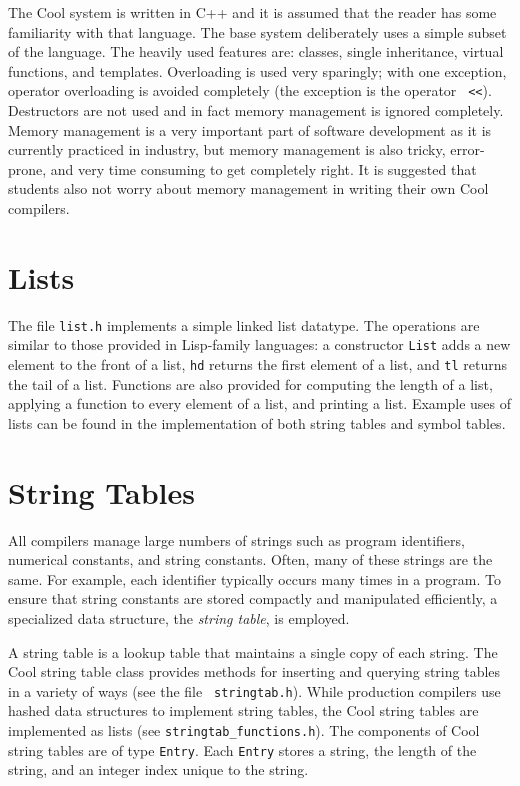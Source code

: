 \documentclass[11pt]{article}
\begin{document}
The Cool system is written in C++ and it is assumed that the reader
has some familiarity with that language.  The base system deliberately
uses a simple subset of the language.  The heavily used features are:
classes, single inheritance, virtual functions, and templates.
Overloading is used very sparingly; with one exception, operator
overloading is avoided completely (the exception is the operator {\tt
<<}).  Destructors are not used and in fact memory management is
ignored completely.  Memory management is a very important part of
software development as it is currently practiced in industry, but
memory management is also tricky, error-prone, and very time consuming
to get completely right.  It is suggested that students also not
worry about memory management in writing their own Cool compilers.

\section{Lists}

The file {\tt list.h} implements a simple linked list datatype.  The operations
are similar to those provided in Lisp-family languages: a constructor {\tt List}
adds a new element to the front of a list, {\tt hd} returns the first element
of a list, and {\tt tl} returns the tail of a list.  Functions are also
provided for computing the length of a list, applying a function to every
element of a list, and printing a list.
Example uses of lists can be found 
in the implementation of both string tables and symbol tables.

\section{String Tables}

All compilers manage large numbers of strings such as
program identifiers, numerical constants, and string constants.
Often, many of these strings are the same. For example,
each identifier typically occurs many times in a program.
To ensure that string constants are stored compactly and 
manipulated efficiently, a specialized data structure, the
{\em string table}, is employed.

A string table is a lookup table that maintains a single copy of each
string.  The Cool string table class provides methods for inserting
and querying string tables in a variety of ways (see the file {\tt
stringtab.h}).  While production compilers use hashed data structures
to implement string tables, the Cool string tables are implemented
as lists (see {\tt stringtab\_functions.h}).  The components
of Cool string tables are of type {\tt Entry}.  Each {\tt Entry}
stores a string, the length of the string, and an integer index unique
to the string.
\end{document}
